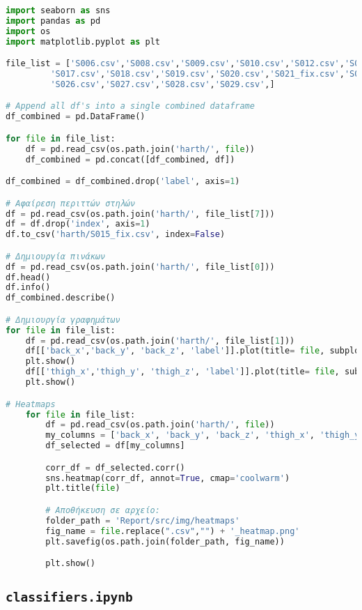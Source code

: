 \begin{lstlisting}[language=Python]
import seaborn as sns
import pandas as pd
import os
import matplotlib.pyplot as plt

file_list = ['S006.csv','S008.csv','S009.csv','S010.csv','S012.csv','S013.csv','S014.csv','S015_fix.csv','S016.csv',
         'S017.csv','S018.csv','S019.csv','S020.csv','S021_fix.csv','S022.csv','S023_fix.csv','S024.csv','S025.csv',
         'S026.csv','S027.csv','S028.csv','S029.csv',]

# Append all df's into a single combined dataframe
df_combined = pd.DataFrame()

for file in file_list:
    df = pd.read_csv(os.path.join('harth/', file))
    df_combined = pd.concat([df_combined, df])

df_combined = df_combined.drop('label', axis=1)

# Αφαίρεση περιττών στηλών
df = pd.read_csv(os.path.join('harth/', file_list[7]))
df = df.drop('index', axis=1)
df.to_csv('harth/S015_fix.csv', index=False)

# Δημιουργία πινάκων
df = pd.read_csv(os.path.join('harth/', file_list[0]))
df.head()
df.info()
df_combined.describe()

# Δημιουργία γραφημάτων
for file in file_list:
    df = pd.read_csv(os.path.join('harth/', file_list[1]))
    df[['back_x','back_y', 'back_z', 'label']].plot(title= file, subplots=True)
    plt.show()
    df[['thigh_x','thigh_y', 'thigh_z', 'label']].plot(title= file, subplots=True)
    plt.show()

# Heatmaps
    for file in file_list:
        df = pd.read_csv(os.path.join('harth/', file))
        my_columns = ['back_x', 'back_y', 'back_z', 'thigh_x', 'thigh_y', 'thigh_z']
        df_selected = df[my_columns]

        corr_df = df_selected.corr()
        sns.heatmap(corr_df, annot=True, cmap='coolwarm')
        plt.title(file)

        # Αποθήκευση σε αρχείο:
        folder_path = 'Report/src/img/heatmaps'
        fig_name = file.replace(".csv","") + '_heatmap.png'
        plt.savefig(os.path.join(folder_path, fig_name))

        plt.show()
\end{lstlisting}

    \subsection{\texttt{classifiers.ipynb}}

